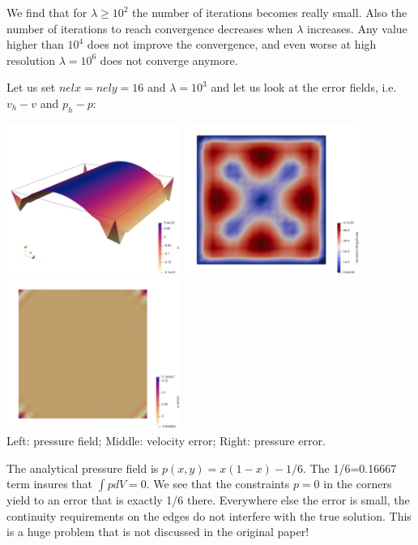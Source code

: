 We find that for $\lambda \ge 10^2$ the number of iterations becomes really small.
Also the number of iterations to reach convergence decreases when $\lambda$ increases. 
Any value higher than $10^4$ does not improve the convergence, and even worse
at high resolution $\lambda=10^6$ does not converge anymore. 

Let us set $nelx=nely=16$ and $\lambda=10^3$ and let us look at the error fields, 
i.e. $v_h-v$ and $p_h-p$:
\begin{center}
\includegraphics[width=5.7cm]{python_codes/fieldstone_161/results/bench1/press2}
\includegraphics[width=5.7cm]{python_codes/fieldstone_161/results/bench1/vel_error}
\includegraphics[width=5.7cm]{python_codes/fieldstone_161/results/bench1/press_error}\\
{\captionfont Left: pressure field; Middle: velocity error; Right: pressure error.} 
\end{center}
The analytical pressure field is $p(x,y)=x(1-x)-1/6$. The 1/6=0.16667 term insures that $\int p dV=0$.
We see that the constraints $p=0$ in the corners yield to an error that is exactly 1/6 there. 
Everywhere else the error is small, the continuity requirements on the edges do not interfere 
with the true solution. 
This is a huge problem that is not discussed in the original paper!

